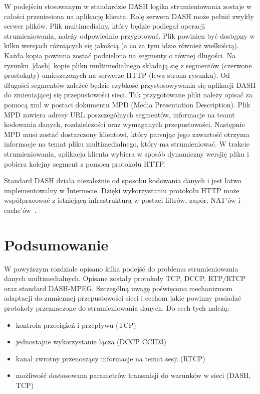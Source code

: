 W podejściu stosowanym w standardzie DASH logika strumieniowania zostaje w całości przeniesiona na aplikację klienta. Rolę serwera DASH może pełnić zwykły serwer plików. Plik multimedialny, który będzie podlegał operacji strumieniowania, należy odpowiednio przygotować. Plik powinien być dostępny w kilku wersjach różniących się jakością (a co za tym idzie również wielkością).  Każda kopia powinna zostać podzielona na segmenty o równej długości. Na rysunku~\ref{dash}~kopie pliku multimedialnego składają się z segmentów (czerwone prostokąty) umieszczonych na serwerze HTTP (lewa strona rysunku). Od długości segmentów zależeć będzie szybkość przystosowywania się aplikacji DASH do zmieniającej się przepustowości sieci. Tak przygotowane pliki należy opisać za pomocą xml w postaci dokumentu MPD (Media Presentation Description). Plik MPD zawiera adresy URL poszczególnych segmentów, informacje na teamt kodowania danych, rozdzielczości oraz wymaganych przepustowości. Następnie MPD musi zostać dostarczony klientowi, który parsując jego zawartość otrzyma informacje na temat pliku multimedialnego, który ma strumieniować. W trakcie strumieniowania, aplikacja klienta wybiera w sposób dynamiczny wersjię pliku i pobiera kolejny segment z pomocą protokołu HTTP. 

Standard DASH działa niezależnie od sposobu kodowania danych i jest łatwo implementowalny w Internecie. Dzięki wykorzystaniu protokołu HTTP może współpracować z istniejącą infrastrukturą w postaci filtrów, zapór, NAT'ów i cache'ów~\cite{DASH}.

\section{Podsumowanie}

W powyższym rozdziale opisano kilka podejść do problemu strumieniowania danych multimedialnych. Opisane zostały protokoły TCP, DCCP, RTP/RTCP oraz standard DASH-MPEG. Szczególną uwagę poświęcono mechanizmom adaptacji do zmniennej przepustowości sieci i cechom jakie powinny posiadać protokoły przeznaczone do strumieniowania danych. Do cech tych należą:
\begin{itemize}
\item kontrola przeciążeń i przepływu (TCP)
\item jednostajne wykorzystanie łącza (DCCP CCID3)
\item kanał zwrotny przenoszący informacje na temat sesji (RTCP)
\item możliwość dostosowana parametrów transmisji do warunków w sieci (DASH, TCP)
\end{itemize}

